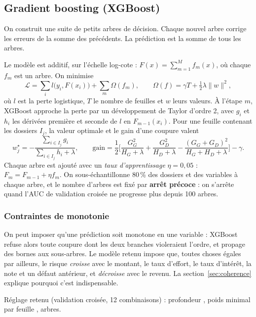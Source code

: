 \documentclass[11pt,a4paper]{article}
\begin{document}
\subsection{Gradient boosting (XGBoost)}
\begin{intuition}[Intuition]
On construit une suite de petits arbres de décision. Chaque nouvel arbre corrige les erreurs de la somme des précédents. La prédiction est la somme de tous les arbres.
\end{intuition}
Le modèle est additif, sur l'échelle log-cote : $F(x) = \sum_{m=1}^M f_m(x)$, où chaque $f_m$ est un arbre. On minimise
\[
\mathcal{L} = \sum_{i} l\big(y_i, F(x_i)\big) + \sum_m \Omega(f_m), \qquad \Omega(f) = \gamma T + \tfrac{1}{2}\lambda \lVert w \rVert^2,
\]
où $l$ est la perte logistique, $T$ le nombre de feuilles et $w$ leurs valeurs. À l'étape $m$, XGBoost approche la perte par un développement de Taylor d'ordre 2, avec $g_i$ et $h_i$ les dérivées première et seconde de $l$ en $F_{m-1}(x_i)$. Pour une feuille contenant les dossiers $I_j$, la valeur optimale et le gain d'une coupure valent
\[
w_j^\star = -\frac{\sum_{i\in I_j} g_i}{\sum_{i\in I_j} h_i + \lambda}, \qquad
\text{gain} = \frac12\Big[\frac{G_G^2}{H_G+\lambda} + \frac{G_D^2}{H_D+\lambda} - \frac{(G_G+G_D)^2}{H_G+H_D+\lambda}\Big] - \gamma .
\]
Chaque arbre est ajouté avec un \emph{taux d'apprentissage} $\eta = 0{,}05$ : $F_m = F_{m-1} + \eta f_m$. On sous-échantillonne 80\,\% des dossiers et des variables à chaque arbre, et le nombre d'arbres est fixé par \textbf{arrêt précoce} : on s'arrête quand l'AUC de validation croisée ne progresse plus depuis 100 arbres.

\subsubsection*{Contraintes de monotonie}
On peut imposer qu'une prédiction soit monotone en une variable : XGBoost refuse alors toute coupure dont les deux branches violeraient l'ordre, et propage des bornes aux sous-arbres. Le modèle retenu impose que, toutes choses égales par ailleurs, le risque \emph{croisse} avec le montant, le taux d'effort, le taux d'intérêt, la note et un défaut antérieur, et \emph{décroisse} avec le revenu. La section~\ref{sec:coherence} explique pourquoi c'est indispensable.

Réglage retenu (validation croisée, 12 combinaisons) : profondeur \profondeurRetenue, poids minimal par feuille \poidsRetenu, \arbresRetenus{} arbres.

\end{document}

